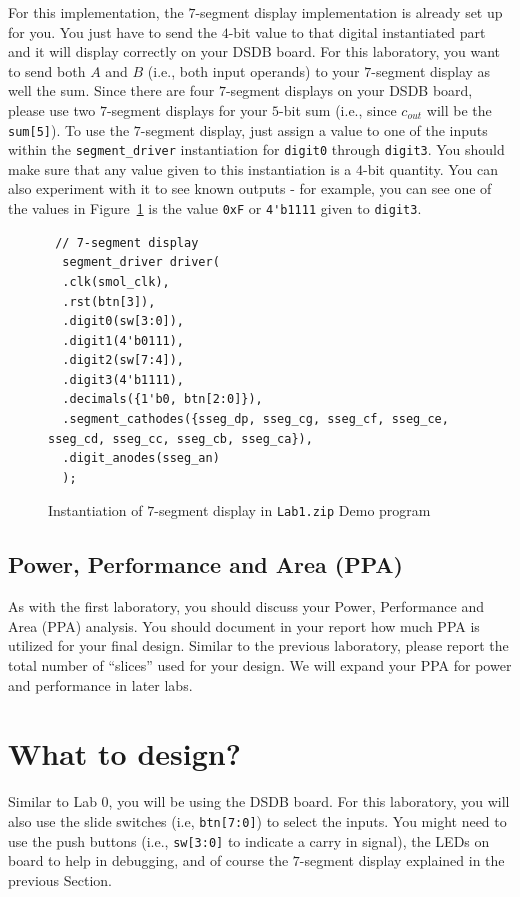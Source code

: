 \documentclass{article}
\begin{document}
For this implementation, the $7$-segment display implementation is
already set up for you.  You just have to send the $4$-bit value to
that digital instantiated part and it will display correctly on your
DSDB board.  For this laboratory, you want to send both $A$ and $B$
(i.e., both input operands) to your $7$-segment display as well the
sum.  Since there are four $7$-segment displays on your DSDB board,
please use two $7$-segment
displays for your $5$-bit sum (i.e., since $c_{out}$
will be the \verb!sum[5]!).  To use the $7$-segment display, just
assign a value to one of the inputs within the \verb!segment_driver!
instantiation for
\verb!digit0! through \verb!digit3!.  You should make sure that any value
given to this instantiation is a $4$-bit quantity.  You can also experiment
with it to see known outputs - for example, you can see one of the
values in
Figure~\ref{demo.fig} is the value \verb!0xF! or \verb!4'b1111!
given to \verb!digit3!.
\begin{figure}
{\small
\begin{verbatim}
 // 7-segment display
  segment_driver driver(
  .clk(smol_clk),
  .rst(btn[3]),
  .digit0(sw[3:0]),
  .digit1(4'b0111),
  .digit2(sw[7:4]),
  .digit3(4'b1111),
  .decimals({1'b0, btn[2:0]}),
  .segment_cathodes({sseg_dp, sseg_cg, sseg_cf, sseg_ce, sseg_cd, sseg_cc, sseg_cb, sseg_ca}),
  .digit_anodes(sseg_an)
  );
\end{verbatim}
}
\cprotect\caption{Instantiation of $7$-segment display in
  \verb!Lab1.zip! Demo program}
\label{demo.fig}
\end{figure}

\subsection{Power, Performance and Area (PPA)}

As with the first laboratory, you should discuss your
Power, Performance and Area (PPA)
analysis.  You should document in your report how much PPA is utilized
for your final design.  Similar to the previous laboratory, please report
the total number of ``slices'' used for your design.  We will expand
your PPA for power and performance in later labs.

\section{What to design?}

Similar to Lab 0, you will be using the DSDB board.
For this laboratory, you will also use the slide switches (i.e,
\verb!btn[7:0]!) to select the
inputs.  You might need to use the push buttons (i.e., \verb!sw[3:0]!
to indicate a carry in signal), the LEDs on board to help in
debugging, and of course the $7$-segment display
explained in the previous Section.
\end{document}

